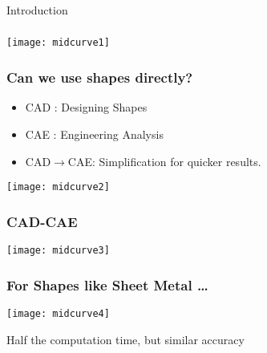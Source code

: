 
\begin{frame}[fragile]\frametitle{}
\begin{center}
{\Large Introduction}
\end{center}
\end{frame}

\begin{frame}[fragile]\frametitle{}
\begin{center}
\texttt{[image: midcurve1]}
\end{center}
\end{frame}


\begin{frame}[fragile]\frametitle{Can we use shapes directly?}
	\begin{itemize}
	\item CAD : Designing Shapes
	\item CAE : Engineering Analysis
	\item CAD$\rightarrow$CAE: Simplification for quicker results.
	\end{itemize}

\begin{center}
\texttt{[image: midcurve2]}
\end{center}

\end{frame}

\begin{frame}[fragile]\frametitle{CAD-CAE}
\begin{center}
\texttt{[image: midcurve3]}
\end{center}
\end{frame}

\begin{frame}[fragile]\frametitle{For Shapes like Sheet Metal \ldots}
\begin{center}
\texttt{[image: midcurve4]}
\end{center}
Half the computation time, but similar accuracy
\end{frame}

